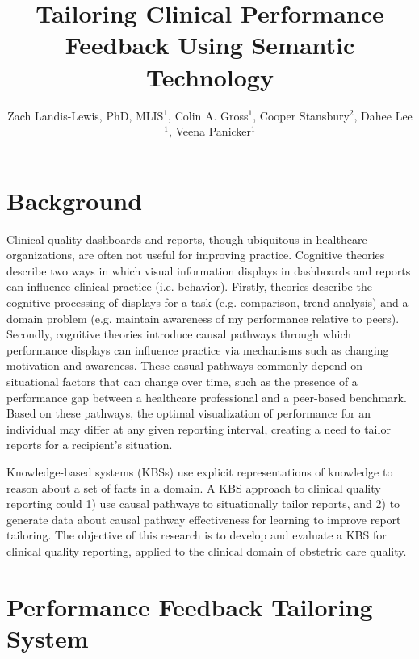 \documentclass{amia}
\begin{document}
\title{Tailoring Clinical Performance Feedback Using Semantic Technology}
\author{Zach Landis-Lewis, PhD, MLIS$^{1}$, Colin A. Gross$^{1}$, Cooper Stansbury$^{2}$, Dahee Lee$^{1}$, Veena Panicker$^{1}$}

\maketitle

\section*{Background}

Clinical quality dashboards and reports, though ubiquitous in healthcare organizations, are often not useful for improving practice\cite{ivers2012, tuti2017}. Cognitive theories describe two ways in which visual information displays in dashboards and reports can influence clinical practice (i.e. behavior). Firstly, theories describe the cognitive processing of displays for a task (e.g. comparison, trend analysis) and a domain problem (e.g. maintain awareness of my performance relative to peers)\cite{zhang1996, munzner2014}. Secondly, cognitive theories introduce causal pathways through which performance displays can influence practice via mechanisms such as changing motivation and awareness\cite{kluger1996}. These casual pathways commonly depend on situational factors that can change over time, such as the presence of a performance gap between a healthcare professional and a peer-based benchmark. Based on these pathways, the optimal visualization of performance for an individual may differ at any given reporting interval, creating a need to tailor reports for a recipient's situation. 

Knowledge-based systems (KBSs) use explicit representations of knowledge to reason about a set of facts in a domain\cite{neapolitan2018}. A KBS approach to clinical quality reporting could 1) use causal pathways to situationally tailor reports, and 2) to generate data about causal pathway effectiveness for learning to improve report tailoring. The objective of this research is to develop and evaluate a KBS for clinical quality reporting, applied to the clinical domain of obstetric care quality.


\section*{Performance Feedback Tailoring System}
\end{document}
